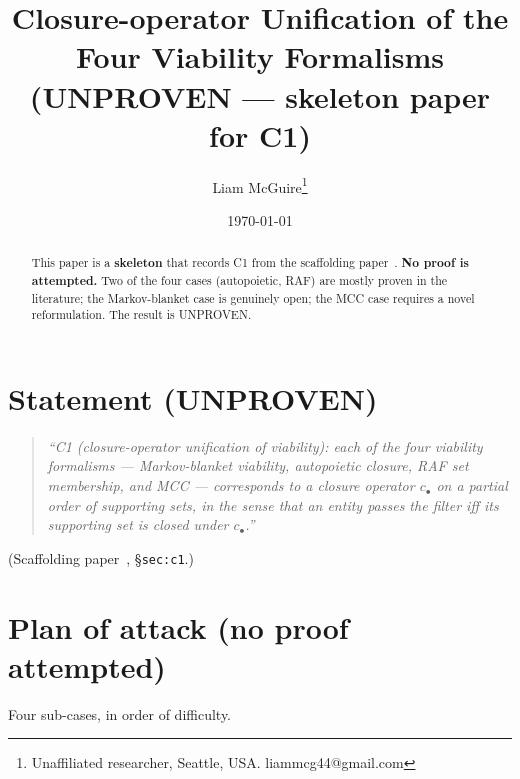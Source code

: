 \documentclass[11pt]{article}
\title{Closure-operator Unification of the Four Viability Formalisms \\
       \large (UNPROVEN --- skeleton paper for C1)}
\author{Liam McGuire\thanks{Unaffiliated researcher, Seattle, USA. liammcg44@gmail.com}}
\date{\today}
\theoremstyle{plain}
\theoremstyle{definition}
\begin{document}
\maketitle

\begin{abstract}
This paper is a \textbf{skeleton} that records C1 from the scaffolding
paper~\cite{emergent_systems_2026}. \textbf{No proof is attempted.}
Two of the four cases (autopoietic, RAF) are mostly proven in the
literature; the Markov-blanket case is genuinely open; the MCC case
requires a novel reformulation. The result is UNPROVEN.
\end{abstract}

\section{Statement (UNPROVEN)}

\begin{quote}
\emph{``C1 (closure-operator unification of viability): each of the
four viability formalisms --- Markov-blanket viability, autopoietic
closure, RAF set membership, and MCC --- corresponds to a closure
operator $c_\bullet$ on a partial order of supporting sets, in the
sense that an entity passes the filter iff its supporting set is
closed under $c_\bullet$.''}
\end{quote}
\noindent (Scaffolding paper~\cite{emergent_systems_2026},
\S\texttt{sec:c1}.)

\section{Plan of attack (no proof attempted)}

Four sub-cases, in order of difficulty.
\end{document}
